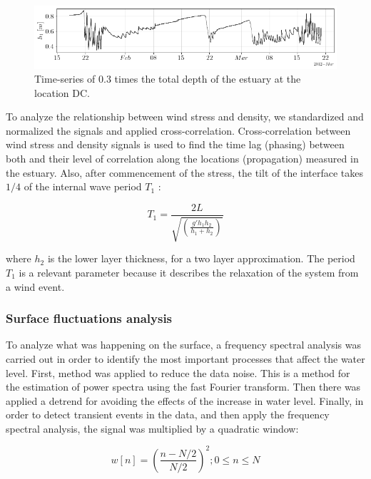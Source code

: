 \documentclass[tesis.tex]{subfiles}
\begin{document}
\begin{figure}[h!]
    \centering
    \includegraphics[width=\textwidth]{Imagenes/h1.png}
    \caption{Time-series of 0.3 times the total depth of the estuary at the location DC.}
    \label{fig:h1}
\end{figure}


To analyze the relationship between wind stress and density, we standardized and normalized the signals and applied cross-correlation. Cross-correlation between wind stress and density signals is used to find the time lag (phasing) between both and their level of correlation along the locations (propagation) measured in the estuary. Also, after commencement of the stress, the tilt of the interface takes $1/4$ of the internal wave period $T_1$ \citep{stevens1996initial}: 

\begin{equation}
    T_1=\frac{2L}{\sqrt{(\frac{g' h_1 h_2}{h_1 + h_2})}}
    \label{eq: period}
\end{equation}

where $h_2$ is the lower layer thickness, for a two layer approximation. The period $T_1$ is a relevant parameter because it describes the relaxation of the system from a wind event.

\subsubsection{Surface fluctuations analysis}

To analyze what was happening on the surface, a frequency spectral analysis was carried out in order to identify the most important processes that affect the water level. First, \cite{welch1967use} method was applied to reduce the data noise. This is a method for the estimation of power spectra using the fast Fourier transform. Then there was applied a detrend for avoiding the effects of the increase in water level. Finally, in order to detect transient events in the data, and then apply the frequency spectral analysis, the signal was multiplied by a quadratic window:

\begin{equation}
    w[n]=\left( \frac{n-N/2}{N/2} \right)^2; 0 \leq n \leq N
    \label{eq: wlch}
\end{equation}
\end{document}
